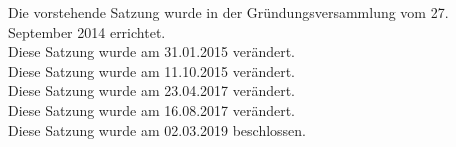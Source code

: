 Die vorstehende Satzung wurde in der Gründungsversammlung vom 27. September 2014 errichtet. \\
Diese Satzung wurde am 31.01.2015 verändert. \\
Diese Satzung wurde am 11.10.2015 verändert. \\
Diese Satzung wurde am 23.04.2017 verändert. \\
Diese Satzung wurde am 16.08.2017 verändert. \\
Diese Satzung wurde am 02.03.2019 beschlossen. \\

